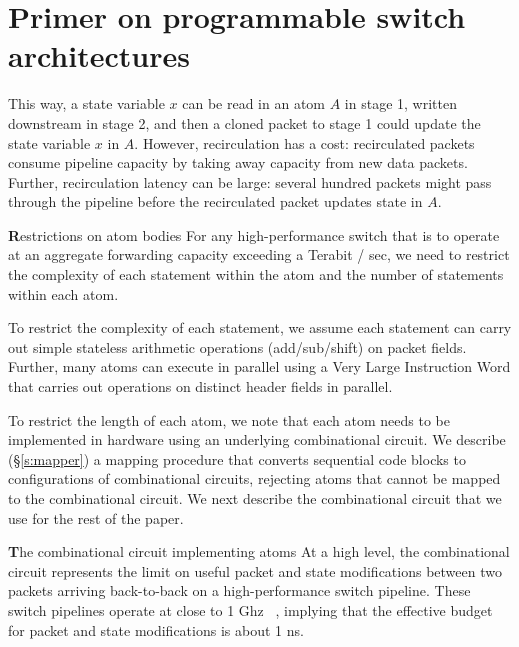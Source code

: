 \section{Primer on programmable switch architectures}
\label{s:architecture}


This way, a state variable $x$ can be read in an atom $A$ in stage 1, written
downstream in stage 2, and then a cloned packet to stage 1 could update the
state variable $x$ in $A$.  However, recirculation has a cost: recirculated
packets consume pipeline capacity by taking away capacity from new data
packets. Further, recirculation latency can be large: several hundred packets
might pass through the pipeline before the recirculated packet updates state in
$A$.

{\textbf Restrictions on atom bodies}
For any high-performance switch that is to operate at an aggregate forwarding
capacity exceeding a Terabit / sec, we need to restrict the complexity of each
statement within the atom and the number of statements within each atom.

To restrict the complexity of each statement, we assume each statement can
carry out simple stateless arithmetic operations (add/sub/shift) on packet
fields. Further, many atoms can execute in parallel using a Very Large
Instruction Word that carries out operations on distinct header fields in
parallel.

To restrict the length of each atom, we note that each atom needs to be
implemented in hardware using an underlying combinational circuit. We describe
(\S\ref{s:mapper}) a mapping procedure that converts sequential code blocks to
configurations of combinational circuits, rejecting atoms that cannot be mapped
to the combinational circuit. We next describe the combinational circuit that
we use for the rest of the paper.

{\textbf The combinational circuit implementing atoms}
At a high level, the combinational circuit represents the limit on useful
packet and state modifications between two packets arriving back-to-back on a
high-performance switch pipeline. These switch pipelines operate at close to 1
Ghz ~\cite{rmt}, implying that the effective budget for packet and state
modifications is about 1 ns.

